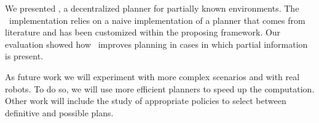 We presented  \toolName, a  decentralized planner for partially known environments.
The \toolName\ implementation relies on a naive implementation of a planner that comes from literature and has been customized within the proposing framework.
Our evaluation showed how  \toolName\ improves planning in cases in which partial information is present.

As future work we will experiment with more complex scenarios and with real robots.
To do so, we will use more efficient planners to speed up the computation.
Other work will include the study of appropriate policies to select between definitive and possible plans.
